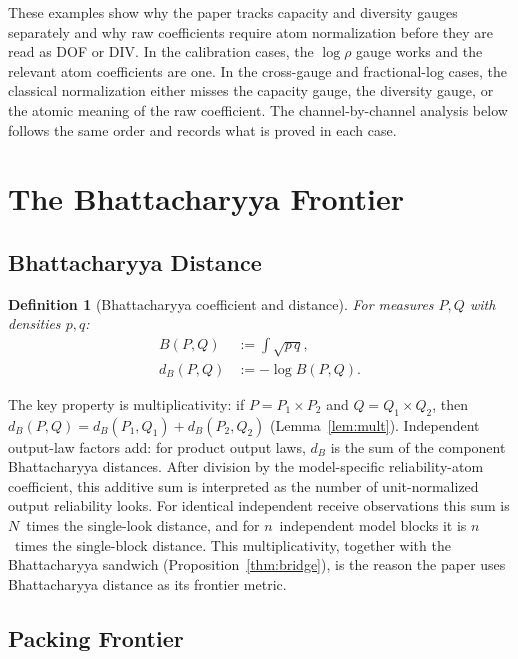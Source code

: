 \documentclass[lettersize,onecolumn]{IEEEtran}
\newtheorem{definition}{Definition}
\newcommand{\snr}{\rho}
\begin{document}
These examples show why the paper tracks capacity and diversity gauges
separately and why raw coefficients require atom normalization before
they are read as DOF or DIV. In the calibration cases, the $\log\snr$
gauge works and the relevant atom coefficients are one. In the
cross-gauge and fractional-log cases, the classical normalization
either misses the capacity gauge, the diversity gauge, or the atomic
meaning of the raw coefficient. The channel-by-channel analysis below
follows the same order and records what is proved in each case.

\section{The Bhattacharyya Frontier}\label{sec:tool}

\subsection{Bhattacharyya Distance}

\begin{definition}[Bhattacharyya coefficient and distance]
\label{def:bhatt}
For measures $P,Q$ with densities $p,q$:
\begin{align}
B(P,Q) &:= \int \sqrt{p\,q}, \label{eq:bhatt_coeff}\\
d_B(P,Q) &:= -\log B(P,Q). \label{eq:bhatt_dist}
\end{align}
\end{definition}

The key property is multiplicativity: if $P = P_1 \times P_2$ and
$Q = Q_1 \times Q_2$, then
$d_B(P,Q) = d_B(P_1,Q_1) + d_B(P_2,Q_2)$
(Lemma~\ref{lem:mult}). Independent output-law factors add: for product output laws,
$d_B$ is the sum of the component Bhattacharyya distances. After
division by the model-specific reliability-atom coefficient, this
additive sum is interpreted as the number of unit-normalized output
reliability looks. For identical independent receive observations
this sum is $N$~times the single-look distance, and for $n$~independent model blocks it is
$n$~times the single-block distance.
This multiplicativity, together with the Bhattacharyya sandwich
(Proposition~\ref{thm:bridge}), is the reason the paper uses
Bhattacharyya distance as its frontier metric.

\subsection{Packing Frontier}
\end{document}
